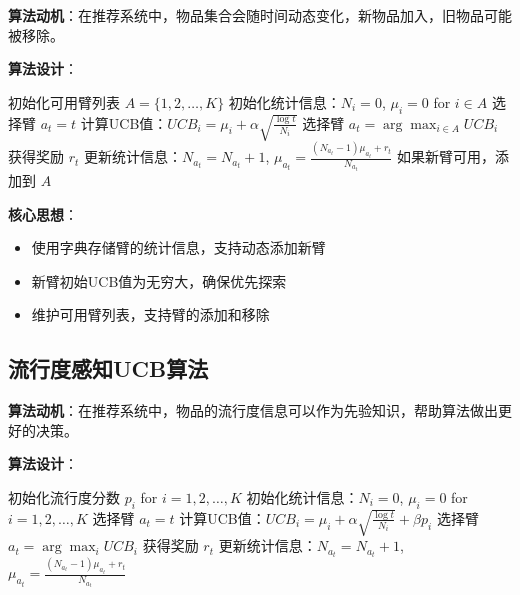 \documentclass[12pt,a4paper]{article}
\begin{document}
\textbf{算法动机}：在推荐系统中，物品集合会随时间动态变化，新物品加入，旧物品可能被移除。

\textbf{算法设计}：
\begin{algorithm}
\caption{动态臂UCB算法}
\begin{algorithmic}[1]
\STATE 初始化可用臂列表 $A = \{1, 2, \ldots, K\}$
\STATE 初始化统计信息：$N_i = 0$, $\mu_i = 0$ for $i \in A$
        \STATE 选择臂 $a_t = t$
    \ELSE
        \STATE 计算UCB值：$UCB_i = \mu_i + \alpha \sqrt{\frac{\log t}{N_i}}$
        \STATE 选择臂 $a_t = \arg\max_{i \in A} UCB_i$
    \ENDIF
    \STATE 获得奖励 $r_t$
    \STATE 更新统计信息：$N_{a_t} = N_{a_t} + 1$, $\mu_{a_t} = \frac{(N_{a_t}-1)\mu_{a_t} + r_t}{N_{a_t}}$
    \STATE 如果新臂可用，添加到 $A$
\ENDFOR
\end{algorithmic}
\end{algorithm}

\textbf{核心思想}：
\begin{itemize}
    \item 使用字典存储臂的统计信息，支持动态添加新臂
    \item 新臂初始UCB值为无穷大，确保优先探索
    \item 维护可用臂列表，支持臂的添加和移除
\end{itemize}

\subsection{流行度感知UCB算法}

\textbf{算法动机}：在推荐系统中，物品的流行度信息可以作为先验知识，帮助算法做出更好的决策。

\textbf{算法设计}：
\begin{algorithm}
\caption{流行度感知UCB算法}
\begin{algorithmic}[1]
\STATE 初始化流行度分数 $p_i$ for $i = 1, 2, \ldots, K$
\STATE 初始化统计信息：$N_i = 0$, $\mu_i = 0$ for $i = 1, 2, \ldots, K$
        \STATE 选择臂 $a_t = t$
    \ELSE
        \STATE 计算UCB值：$UCB_i = \mu_i + \alpha \sqrt{\frac{\log t}{N_i}} + \beta p_i$
        \STATE 选择臂 $a_t = \arg\max_{i} UCB_i$
    \ENDIF
    \STATE 获得奖励 $r_t$
    \STATE 更新统计信息：$N_{a_t} = N_{a_t} + 1$, $\mu_{a_t} = \frac{(N_{a_t}-1)\mu_{a_t} + r_t}{N_{a_t}}$
\ENDFOR
\end{algorithmic}
\end{algorithm}
\end{document}
